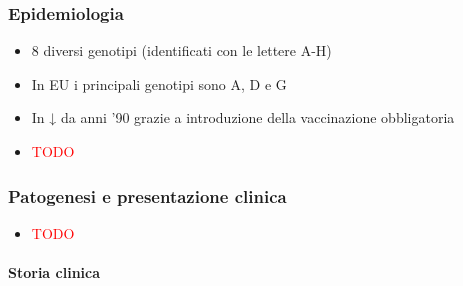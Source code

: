 \documentclass[italian,]{article}
\newcommand{\TODO}[1]{\textcolor{red}{\textsf{\footnotesize{TODO #1}}}} %
\begin{document}
\hypertarget{epidemiologia-6}{%
\subsubsection{Epidemiologia}\label{epidemiologia-6}}

\begin{itemize}
\item
  8 diversi genotipi (identificati con le lettere A-H)
\item
  In EU i principali genotipi sono A, D e G
\item
  In ↓ da anni '90 grazie a introduzione della vaccinazione obbligatoria
\item
  \TODO{}
\end{itemize}

\hypertarget{patogenesi-e-presentazione-clinica}{%
\subsubsection{Patogenesi e presentazione
clinica}\label{patogenesi-e-presentazione-clinica}}

\begin{itemize}
\item
  \TODO{}
\end{itemize}

\hypertarget{storia-clinica}{%
\paragraph{Storia clinica}\label{storia-clinica}}
\end{document}
